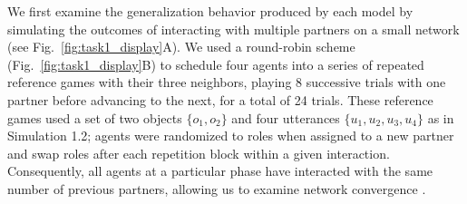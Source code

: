 We first examine the generalization behavior produced by each model by simulating the outcomes of interacting with multiple partners on a small network (see Fig.~\ref{fig:task1_display}A). 
We used a round-robin scheme (Fig.~\ref{fig:task1_display}B) to schedule four agents into a series of repeated reference games with their three neighbors, playing 8 successive trials with one partner before advancing to the next, for a total of 24 trials.
These reference games used a set of two objects $\{o_1, o_2\}$ and four utterances $\{u_1, u_2, u_3, u_4\}$ as in Simulation 1.2; agents were randomized to roles when assigned to a new partner and swap roles after each repetition block within a given interaction.
Consequently, all agents at a particular phase have interacted with the same number of previous partners, allowing us to examine network convergence \cite<but see>[for a ``first-person'' version where each new partner is entirely fresh to the task, finding similar speaker generalization]{hawkins2020generalizing}.

